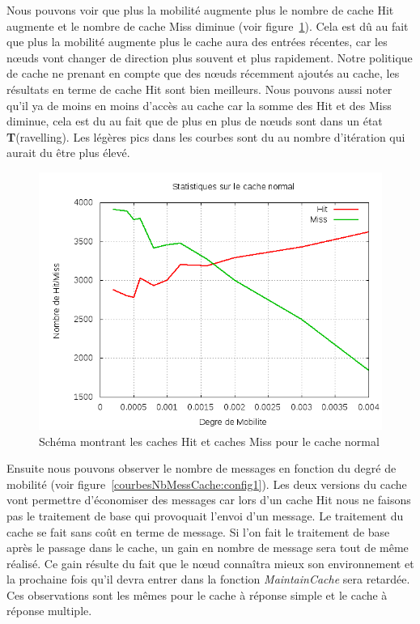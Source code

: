 \par Nous pouvons voir que plus la mobilité augmente plus le nombre de cache Hit augmente et le nombre de cache Miss diminue (voir figure~\ref{courbesHitMiss:config1}). Cela est dû au fait que plus la mobilité augmente plus le cache aura des entrées récentes, car les nœuds vont changer de direction plus souvent et plus rapidement. Notre politique de cache ne prenant en compte que des nœuds récemment ajoutés au cache, les résultats en terme de cache Hit sont bien meilleurs. Nous pouvons aussi noter qu'il ya de moins en moins d'accès au cache car la somme des Hit et des Miss diminue, cela est du au fait que de plus en plus de nœuds sont dans un état \textbf{T}(ravelling). Les légères pics dans les courbes sont du au nombre d'itération qui aurait du être plus élevé.

	\begin{figure}[!h]
        \centering
        \includegraphics[scale=0.5]{../CacheCode/SolipsisPeersim/resultats/Courbes/Courbes_Final_Rapport/Cache_Stats_Normal.png}
        \caption{Schéma montrant les caches Hit et caches Miss pour le cache normal}
        \label{courbesHitMiss:config1}
        \end{figure}
\newpage
\par Ensuite nous pouvons observer le nombre de messages en fonction du degré de mobilité (voir figure~\ref{courbesNbMessCache:config1}). Les deux versions du cache vont permettre d'économiser des messages car lors d'un cache Hit nous ne faisons pas le traitement de base qui provoquait l'envoi d'un message. Le traitement du cache se fait sans coût en terme de message. Si l'on fait le traitement de base après le passage dans le cache, un gain en nombre de message sera tout de même réalisé. Ce gain résulte du fait que le nœud connaîtra mieux son environnement et la prochaine fois qu'il devra entrer dans la fonction \textit{MaintainCache} sera retardée. Ces observations sont les mêmes pour le cache à réponse simple et le cache à réponse multiple.  


